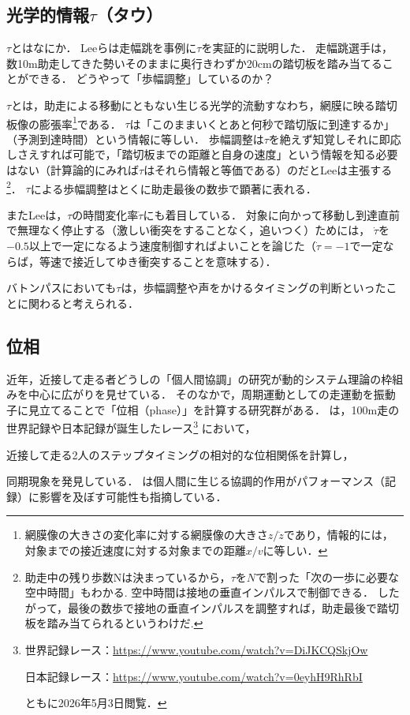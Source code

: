 \documentclass{jsai2e}
\newif\ifshowlabels
\newcommand{\tagtext}[3]{%
  \ifshowlabels
    \textcolor{#1}{#3\textsuperscript{\textsf{[#2]}}}%
  \else
    #3%
  \fi
}
\newcommand{\furu}[2]{\tagtext{furu}{#1}{#2}}
\begin{document}
\subsection{光学的情報$\tau$（タウ）}\label{subsec:tau}
$\tau$とはなにか．
Leeら\cite{lee1982}は走幅跳を事例に$\tau$を実証的に説明した．
走幅跳選手は，数10m助走してきた勢いそのままに奥行きわずか20cmの踏切板を踏み当てることができる．
どうやって「歩幅調整」しているのか？

$\tau$とは，助走による移動にともない生じる光学的流動すなわち，網膜に映る踏切板像の膨張率\footnote{
網膜像の大きさの変化率に対する網膜像の大きさ$z/\dot{z}$であり，情報的には，対象までの接近速度に対する対象までの距離$x/v$に等しい．
}である．
$\tau$は「このままいくとあと何秒で踏切版に到達するか」（予測到達時間）という情報に等しい．
歩幅調整は$\tau$を絶えず知覚しそれに即応しさえすれば可能で，「踏切板までの距離と自身の速度」という情報を知る必要はない（計算論的にみれば$\tau$はそれら情報と等価である）のだとLeeは主張する
\footnote{
助走中の残り歩数Nは決まっているから，$τ$を$N$で割った「次の一歩に必要な空中時間」もわかる.
空中時間は接地の垂直インパルスで制御できる．
したがって，最後の数歩で接地の垂直インパルスを調整すれば，助走最後で踏切板を踏み当てられるというわけだ.
}．
$\tau$による歩幅調整はとくに助走最後の数歩で顕著に表れる．

またLee\cite{Lee1998}は，$\tau$の時間変化率$\dot{\tau}$にも着目している．
対象に向かって移動し到達直前で無理なく停止する（激しい衝突をすることなく，追いつく）ためには，
$\dot{\tau}$を$-0.5$以上で一定になるよう速度制御すればよいことを論じた（$\dot{\tau}=-1$で一定ならば，等速で接近してゆき衝突することを意味する）．


バトンパスにおいても$\tau$は，歩幅調整や声をかけるタイミングの判断といったことに関わると考えられる．


\subsection{位相}\label{subsec:phase}
近年，近接して走る者どうしの「個人間協調」の研究が動的システム理論の枠組みを中心に広がりを見せている．
そのなかで，周期運動としての走運動を振動子に見立てることで「位相（phase）」を計算する研究群がある．
\cite{varlet2015,furukawa2024}は，100m走の世界記録や日本記録が誕生したレース\footnote{
世界記録レース：\url{https://www.youtube.com/watch?v=DiJKCQSkjOw}

日本記録レース：\url{https://www.youtube.com/watch?v=0eyhH9RhRbI}

ともに2026年5月3日閲覧．
}
において，\furu{}{近接して走る2人のステップタイミングの相対的な位相関係を計算し，}同期現象を発見している．
\cite{varlet2015,furukawa2024}は個人間に生じる協調的作用がパフォーマンス（記録）に影響を及ぼす可能性も指摘している．
\end{document}
